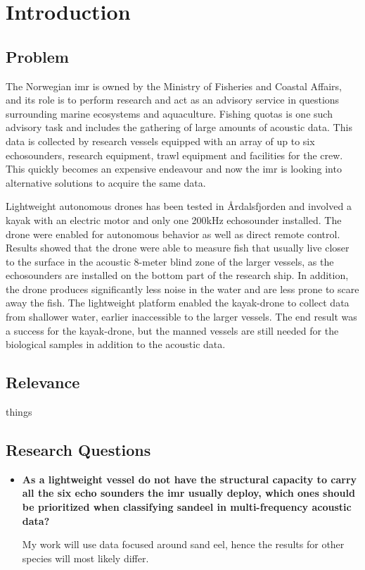\chapter{Introduction}


    \section{Problem}
    
    
    
    The Norwegian \gls{imr} is owned by the Ministry of Fisheries and Coastal Affairs, and its role is to perform research and act as an advisory service in questions surrounding marine ecosystems and aquaculture\cite{IMR}. Fishing quotas is one such advisory task and includes the gathering of large amounts of acoustic data. This data is collected by research vessels\cite{IMR-vessels} equipped with an array of up to six echosounders, research equipment, trawl equipment and facilities for the crew. This quickly becomes an expensive endeavour and now the \gls{imr} is looking into alternative solutions to acquire the same data. 
    
    Lightweight autonomous drones\cite{johnsen2020measuring} has been tested in Årdalsfjorden and involved a kayak with an electric motor and only one 200kHz echosounder installed. The drone were enabled for autonomous behavior as well as direct remote control. Results showed that the drone were able to measure fish that usually live closer to the surface in the acoustic 8-meter blind zone of the larger vessels, as the echosounders are installed on the bottom part of the research ship. In addition, the drone produces significantly less noise in the water and are less prone to scare away the fish. The lightweight platform enabled the kayak-drone to collect data from shallower water, earlier inaccessible to the larger vessels. The end result was a success for the kayak-drone, but the manned vessels are still needed for the biological samples in addition to the acoustic data. 
    
    
    \section{Relevance}
        things

\section{Research Questions}
    \begin{itemize}
        \item \textbf{As a lightweight vessel do not have the structural capacity to carry all the six echo sounders the \gls{imr} usually deploy, which ones should be prioritized when classifying sandeel in multi-frequency acoustic data?}
        
        My work will use data focused around sand eel, hence the results for other species will most likely differ.
    \end{itemize}



